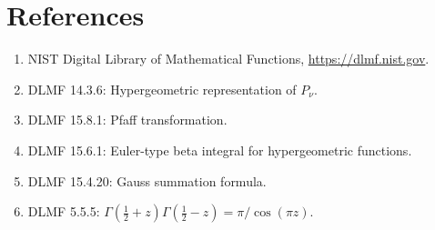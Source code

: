 \documentclass[11pt]{article}
\begin{document}
 	\section*{References} 
 	\begin{enumerate} \item NIST Digital Library of Mathematical Functions, \url{https://dlmf.nist.gov}. \item DLMF 14.3.6: Hypergeometric representation of \(P_\nu\). \item DLMF 15.8.1: Pfaff transformation. \item DLMF 15.6.1: Euler-type beta integral for hypergeometric functions. \item DLMF 15.4.20: Gauss summation formula. \item DLMF 5.5.5: \( \Gamma(\tfrac12+z) \Gamma(\tfrac12-z) =\pi/\cos(\pi z) \). 
 \end{enumerate} 
\end{document}
